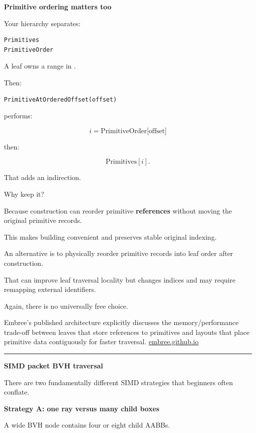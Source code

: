 \textbf{Primitive ordering matters too}

Your hierarchy separates:

\begin{verbatim}
Primitives
PrimitiveOrder
\end{verbatim}

A leaf owns a range in .

Then:

\begin{verbatim}
PrimitiveAtOrderedOffset(offset)
\end{verbatim}

performs:

\[
i=\text{PrimitiveOrder[offset]}
\]

then:

\[
\text{Primitives}[i].
\]

That adds an indirection.

Why keep it?

Because construction can reorder primitive \textbf{references} without moving the original primitive records.

This makes building convenient and preserves stable original indexing.

An alternative is to physically reorder primitive records into leaf order after construction.

That can improve leaf traversal locality but changes indices and may require remapping external identifiers.

Again, there is no universally free choice.

Embree's published architecture explicitly discusses the memory/performance trade-off between leaves that store references to primitives and layouts that place primitive data contiguously for faster traversal. \href{https://embree.github.io/papers/2014-Siggraph-Embree.pdf?utm_source=chatgpt.com}{embree.github.io}

\begin{center}\rule{0.5\linewidth}{0.5pt}\end{center}

\textbf{SIMD packet BVH traversal}

There are two fundamentally different SIMD strategies that beginners often conflate.

\textbf{Strategy A: one ray versus many child boxes}

A wide BVH node contains four or eight child AABBs.

